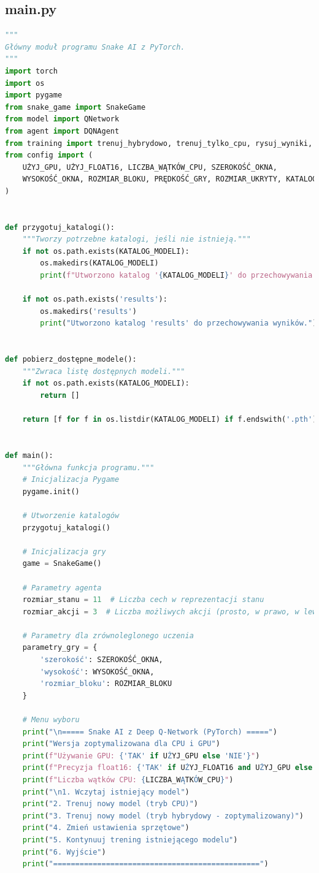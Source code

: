 \documentclass[a4paper,12pt]{article}
\begin{document}
\subsection{main.py}
\begin{lstlisting}[language=Python]
"""
Główny moduł programu Snake AI z PyTorch.
"""
import torch
import os
import pygame
from snake_game import SnakeGame
from model import QNetwork
from agent import DQNAgent
from training import trenuj_hybrydowo, trenuj_tylko_cpu, rysuj_wyniki, testuj_agenta
from config import (
    UŻYJ_GPU, UŻYJ_FLOAT16, LICZBA_WĄTKÓW_CPU, SZEROKOŚĆ_OKNA, 
    WYSOKOŚĆ_OKNA, ROZMIAR_BLOKU, PRĘDKOŚĆ_GRY, ROZMIAR_UKRYTY, KATALOG_MODELI
)


def przygotuj_katalogi():
    """Tworzy potrzebne katalogi, jeśli nie istnieją."""
    if not os.path.exists(KATALOG_MODELI):
        os.makedirs(KATALOG_MODELI)
        print(f"Utworzono katalog '{KATALOG_MODELI}' do przechowywania modeli.")
    
    if not os.path.exists('results'):
        os.makedirs('results')
        print("Utworzono katalog 'results' do przechowywania wyników.")


def pobierz_dostępne_modele():
    """Zwraca listę dostępnych modeli."""
    if not os.path.exists(KATALOG_MODELI):
        return []
    
    return [f for f in os.listdir(KATALOG_MODELI) if f.endswith('.pth')]


def main():
    """Główna funkcja programu."""
    # Inicjalizacja Pygame
    pygame.init()
    
    # Utworzenie katalogów
    przygotuj_katalogi()
    
    # Inicjalizacja gry
    game = SnakeGame()
    
    # Parametry agenta
    rozmiar_stanu = 11  # Liczba cech w reprezentacji stanu
    rozmiar_akcji = 3  # Liczba możliwych akcji (prosto, w prawo, w lewo)
    
    # Parametry dla zrównoleglonego uczenia
    parametry_gry = {
        'szerokość': SZEROKOŚĆ_OKNA,
        'wysokość': WYSOKOŚĆ_OKNA,
        'rozmiar_bloku': ROZMIAR_BLOKU
    }
    
    # Menu wyboru
    print("\n===== Snake AI z Deep Q-Network (PyTorch) =====")
    print("Wersja zoptymalizowana dla CPU i GPU")
    print(f"Używanie GPU: {'TAK' if UŻYJ_GPU else 'NIE'}")
    print(f"Precyzja float16: {'TAK' if UŻYJ_FLOAT16 and UŻYJ_GPU else 'NIE'}")
    print(f"Liczba wątków CPU: {LICZBA_WĄTKÓW_CPU}")
    print("\n1. Wczytaj istniejący model")
    print("2. Trenuj nowy model (tryb CPU)")
    print("3. Trenuj nowy model (tryb hybrydowy - zoptymalizowany)")
    print("4. Zmień ustawienia sprzętowe")
    print("5. Kontynuuj trening istniejącego modelu")
    print("6. Wyjście")
    print("===============================================")
    

\end{lstlisting}
\end{document}
